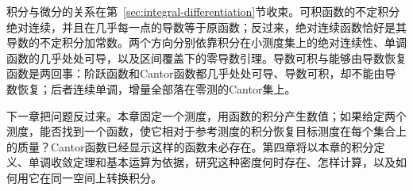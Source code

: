 积分与微分的关系在第~\ref{sec:integral-differentiation}节收束。可积函数的不定积分绝对连续，并且在几乎每一点的导数等于原函数；反过来，绝对连续函数恰好是其导数的不定积分加常数。两个方向分别依靠积分在小测度集上的绝对连续性、单调函数的几乎处处可导，以及区间覆盖下的零导数引理。导数可积与能够由导数恢复函数是两回事：阶跃函数和Cantor函数都几乎处处可导、导数可积，却不能由导数恢复；后者连续单调，增量全部落在零测的Cantor集上。

下一章把问题反过来。本章固定一个测度，用函数的积分产生数值；如果给定两个测度，能否找到一个函数，使它相对于参考测度的积分恢复目标测度在每个集合上的质量？Cantor函数已经显示这样的函数未必存在。第四章将以本章的积分定义、单调收敛定理和基本运算为依据，研究这种密度何时存在、怎样计算，以及如何用它在同一空间上转换积分。
